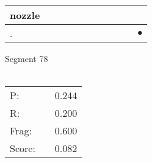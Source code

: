 \documentclass[landscape]{article}
\newcommand{\ssp}{\hspace{2pt}}
\newcommand{\mex}{\cellcolor{g}$\bullet$}
\begin{document}
\begin{tabular}{|l|p{10pt}|p{10pt}|p{10pt}|p{10pt}|p{10pt}|p{10pt}|p{10pt}|p{10pt}|p{10pt}|p{10pt}|}
\hline
\ssp nozzle \ssp&\hspace{2pt}&\hspace{2pt}&\hspace{2pt}&\hspace{2pt}&\hspace{2pt}&\hspace{2pt}&\hspace{2pt}&\hspace{2pt}&\hspace{2pt}&\hspace{2pt}\\
\hline
\ssp \cellcolor{ref9}. \ssp&\hspace{2pt}&\hspace{2pt}&\hspace{2pt}&\hspace{2pt}&\hspace{2pt}&\hspace{2pt}&\hspace{2pt}&\hspace{2pt}&\hspace{2pt}&\hspace{2pt}\mex\\
\hline
\end{tabular}

\vspace{6pt}
\noindent Segment 78\\\\
\noindent\begin{tabular}{lm{12pt}r}
\hline
P:&&0.244\\
R:&&0.200\\
Frag:&&0.600\\
Score:&&0.082\\
\end{tabular}

\newpage
\end{document}
